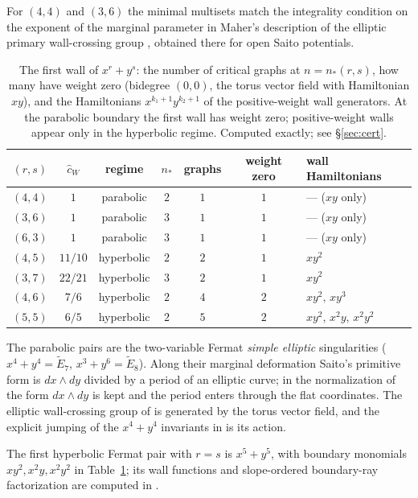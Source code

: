 \documentclass[11pt]{amsart}
\theoremstyle{definition}
\theoremstyle{remark}
\newcommand{\chat}{\hat{c}}
\begin{document}
For $(4,4)$ and $(3,6)$ the minimal multisets match the integrality condition
on the exponent of the marginal parameter in Maher's description of the
elliptic primary wall-crossing group \cite[Proposition~5.2.10 and
Example~5.2.13]{Maher}, obtained there for open Saito potentials.

\begin{table}[ht]
\centering
\begin{tabular}{ccccccl}
\toprule
$(r,s)$ & $\chat_{W}$ & regime & $n_{*}$ & graphs & weight zero & wall Hamiltonians\\
\midrule
$(4,4)$ & $1$ & parabolic & $2$ & $1$ & $1$ & --- ($xy$ only)\\
$(3,6)$ & $1$ & parabolic & $3$ & $1$ & $1$ & --- ($xy$ only)\\
$(6,3)$ & $1$ & parabolic & $3$ & $1$ & $1$ & --- ($xy$ only)\\
$(4,5)$ & $11/10$ & hyperbolic & $2$ & $2$ & $1$ & $xy^{2}$\\
$(3,7)$ & $22/21$ & hyperbolic & $3$ & $2$ & $1$ & $xy^{2}$\\
$(4,6)$ & $7/6$ & hyperbolic & $2$ & $4$ & $2$ & $xy^{2},\,xy^{3}$\\
$(5,5)$ & $6/5$ & hyperbolic & $2$ & $5$ & $2$ & $xy^{2},\,x^{2}y,\,x^{2}y^{2}$\\
\bottomrule
\end{tabular}
\caption{The first wall of $x^{r}+y^{s}$: the number of critical graphs at
$n=n_{*}(r,s)$, how many have weight zero (bidegree $(0,0)$, the torus vector
field with Hamiltonian $xy$), and the Hamiltonians $x^{k_{1}+1}y^{k_{2}+1}$ of
the positive-weight wall generators. At the parabolic boundary the first wall
has weight zero; positive-weight walls appear only in the hyperbolic regime.
Computed exactly; see \S\ref{sec:cert}.}
\label{tab:census}
\end{table}

The parabolic pairs are the two-variable Fermat \emph{simple elliptic}
singularities ($x^{4}+y^{4}=\widetilde E_{7}$, $x^{3}+y^{6}=\widetilde E_{8}$).
Along their marginal deformation Saito's primitive form is $dx\wedge dy$
divided by a period of an elliptic curve; in the normalization of
\cite[Theorem~0.3]{GKT} the form $dx\wedge dy$ is kept and the period enters
through the flat coordinates.  The elliptic wall-crossing group of
\cite[\S5.2.2]{Maher} is generated by the torus vector field, and the
explicit jumping of the
$x^{4}+y^{4}$ invariants in \cite[Example~4.9]{GKTsurvey} is its action.

The first hyperbolic Fermat pair with $r=s$ is $x^{5}+y^{5}$, with boundary
monomials $xy^{2},x^{2}y,x^{2}y^{2}$ in Table~\ref{tab:census}; its wall
functions and slope-ordered boundary-ray factorization are computed in
\cite{companion}.
\end{document}
